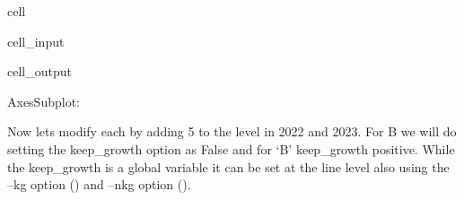 \documentclass[letterpaper,10pt,english]{jupyterBook}
\begin{document}
\begin{sphinxuseclass}{cell}\begin{sphinxVerbatimInput}

\begin{sphinxuseclass}{cell_input}
\begin{sphinxVerbatim}[commandchars=\\\{\}]
\PYG{p}{[}\PYG{p}{[}\PYG{p}{]}\PYG{p}{]}
\end{sphinxVerbatim}

\end{sphinxuseclass}\end{sphinxVerbatimInput}
\begin{sphinxVerbatimOutput}

\begin{sphinxuseclass}{cell_output}
\begin{sphinxVerbatim}[commandchars=\\\{\}]
\PYGZlt{}AxesSubplot:\PYGZgt{}
\end{sphinxVerbatim}

\noindent{}

\end{sphinxuseclass}\end{sphinxVerbatimOutput}

\end{sphinxuseclass}
\sphinxAtStartPar
Now lets modify each by adding 5 to the level in 2022 and 2023.  For B we will do setting the keep\_growth option as False and for ‘B’ keep\_growth positive.  While the keep\_growth is a global variable it can be set at the line level also using the –kg option () and –nkg option ().
\end{document}

